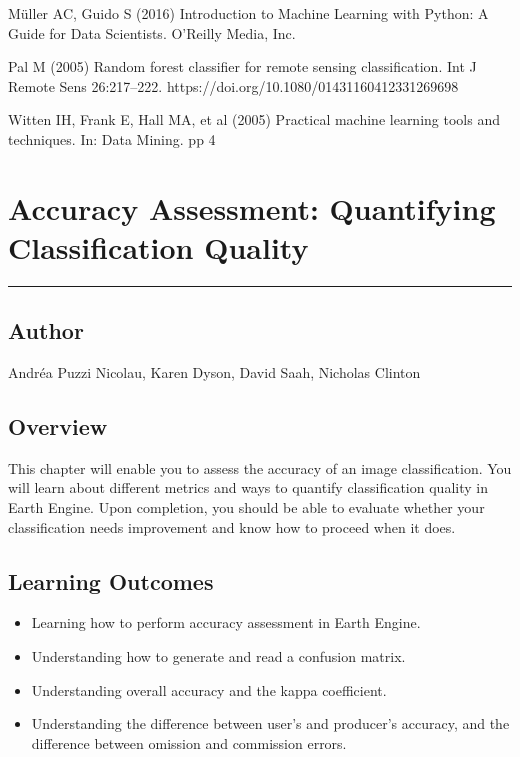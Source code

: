 \documentclass[
  letterpaper,
  DIV=11,
  numbers=noendperiod]{scrreprt}
\providecommand{\tightlist}{%
  \setlength{\itemsep}{0pt}\setlength{\parskip}{0pt}}\usepackage{longtable,booktabs,array}
\begin{document}
Müller AC, Guido S (2016) Introduction to Machine Learning with Python:
A Guide for Data Scientists. O'Reilly Media, Inc.

Pal M (2005) Random forest classifier for remote sensing classification.
Int J Remote Sens 26:217--222.
https://doi.org/10.1080/01431160412331269698

Witten IH, Frank E, Hall MA, et al (2005) Practical machine learning
tools and techniques. In: Data Mining. pp 4

\hypertarget{accuracy-assessment-quantifying-classification-quality}{%
\chapter{Accuracy Assessment: Quantifying Classification
Quality}\label{accuracy-assessment-quantifying-classification-quality}}

\begin{center}\rule{0.5\linewidth}{0.5pt}\end{center}

\hypertarget{author-4}{%
\section*{Author}\label{author-4}}


Andréa Puzzi Nicolau, Karen Dyson, David Saah, Nicholas Clinton

\hypertarget{overview-6}{%
\section*{Overview}\label{overview-6}}


This chapter will enable you to assess the accuracy of an image
classification. You will learn about different metrics and ways to
quantify classification quality in Earth Engine. Upon completion, you
should be able to evaluate whether your classification needs improvement
and know how to proceed when it does.

\hypertarget{learning-outcomes-6}{%
\section*{Learning Outcomes}\label{learning-outcomes-6}}


\begin{itemize}
\tightlist
\item
  Learning how to perform accuracy assessment in Earth Engine.
\item
  Understanding how to generate and read a confusion matrix.
\item
  Understanding overall accuracy and the kappa coefficient.
\item
  Understanding the difference between user's and producer's accuracy,
  and the difference between omission and commission errors.
\end{itemize}
\end{document}
